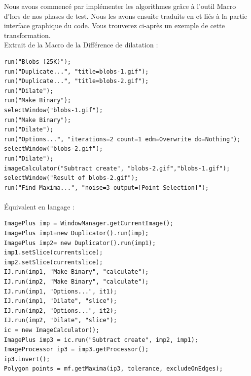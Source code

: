 Nous avons commencé par implémenter les algorithmes grâce à l'outil Macro d'\imj lors de nos  phases de test. Nous les avons ensuite traduits en \java et liés à la partie interface graphique du code. Vous trouverez ci-après un exemple de cette transformation. \\

Extrait de la Macro de la Différence de dilatation :
\begin{center}
\begin{fmpage}{16cm}
\begin{small}
\begin{lstlisting}
run("Blobs (25K)");
run("Duplicate...", "title=blobs-1.gif");
run("Duplicate...", "title=blobs-2.gif");
run("Dilate");
run("Make Binary");
selectWindow("blobs-1.gif");
run("Make Binary");
run("Dilate");
run("Options...", "iterations=2 count=1 edm=Overwrite do=Nothing");
selectWindow("blobs-2.gif");
run("Dilate");
imageCalculator("Subtract create", "blobs-2.gif","blobs-1.gif");
selectWindow("Result of blobs-2.gif");
run("Find Maxima...", "noise=3 output=[Point Selection]");
\end{lstlisting}
\end{small}	
\end{fmpage}
\end{center}

\paragraph*{}
Équivalent en langage \java :
\begin{center}
\begin{fmpage}{16cm}
\begin{small}
\begin{lstlisting}
ImagePlus imp = WindowManager.getCurrentImage();
ImagePlus imp1=new Duplicator().run(imp);
ImagePlus imp2= new Duplicator().run(imp1);
imp1.setSlice(currentslice);
imp2.setSlice(currentslice);
IJ.run(imp1, "Make Binary", "calculate");
IJ.run(imp2, "Make Binary", "calculate");
IJ.run(imp1, "Options...", it1);
IJ.run(imp1, "Dilate", "slice");
IJ.run(imp2, "Options...", it2);
IJ.run(imp2, "Dilate", "slice");
ic = new ImageCalculator();
ImagePlus imp3 = ic.run("Subtract create", imp2, imp1);
ImageProcessor ip3 = imp3.getProcessor();
ip3.invert();
Polygon points = mf.getMaxima(ip3, tolerance, excludeOnEdges);
\end{lstlisting}
\end{small}	
\end{fmpage}
\end{center}

